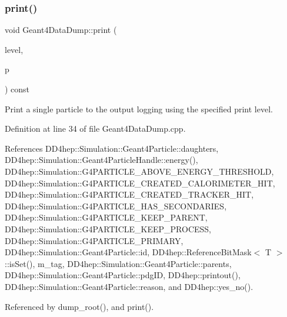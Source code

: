 \subsubsection{\texorpdfstring{print()}{print()}\hspace{0.1cm}{\footnotesize\ttfamily [1/6]}}
{\footnotesize\ttfamily void Geant4\+Data\+Dump\+::print (\begin{DoxyParamCaption}\item[{\hyperlink{namespace_d_d4hep_a5b5a64d56252469451f2020a27d57d42}{Print\+Level}}]{level,  }\item[{\hyperlink{class_d_d4hep_1_1_simulation_1_1_geant4_particle_handle}{Geant4\+Particle\+Handle}}]{p }\end{DoxyParamCaption}) const}



Print a single particle to the output logging using the specified print level. 



Definition at line 34 of file Geant4\+Data\+Dump.\+cpp.



References D\+D4hep\+::\+Simulation\+::\+Geant4\+Particle\+::daughters, D\+D4hep\+::\+Simulation\+::\+Geant4\+Particle\+Handle\+::energy(), D\+D4hep\+::\+Simulation\+::\+G4\+P\+A\+R\+T\+I\+C\+L\+E\+\_\+\+A\+B\+O\+V\+E\+\_\+\+E\+N\+E\+R\+G\+Y\+\_\+\+T\+H\+R\+E\+S\+H\+O\+LD, D\+D4hep\+::\+Simulation\+::\+G4\+P\+A\+R\+T\+I\+C\+L\+E\+\_\+\+C\+R\+E\+A\+T\+E\+D\+\_\+\+C\+A\+L\+O\+R\+I\+M\+E\+T\+E\+R\+\_\+\+H\+IT, D\+D4hep\+::\+Simulation\+::\+G4\+P\+A\+R\+T\+I\+C\+L\+E\+\_\+\+C\+R\+E\+A\+T\+E\+D\+\_\+\+T\+R\+A\+C\+K\+E\+R\+\_\+\+H\+IT, D\+D4hep\+::\+Simulation\+::\+G4\+P\+A\+R\+T\+I\+C\+L\+E\+\_\+\+H\+A\+S\+\_\+\+S\+E\+C\+O\+N\+D\+A\+R\+I\+ES, D\+D4hep\+::\+Simulation\+::\+G4\+P\+A\+R\+T\+I\+C\+L\+E\+\_\+\+K\+E\+E\+P\+\_\+\+P\+A\+R\+E\+NT, D\+D4hep\+::\+Simulation\+::\+G4\+P\+A\+R\+T\+I\+C\+L\+E\+\_\+\+K\+E\+E\+P\+\_\+\+P\+R\+O\+C\+E\+SS, D\+D4hep\+::\+Simulation\+::\+G4\+P\+A\+R\+T\+I\+C\+L\+E\+\_\+\+P\+R\+I\+M\+A\+RY, D\+D4hep\+::\+Simulation\+::\+Geant4\+Particle\+::id, D\+D4hep\+::\+Reference\+Bit\+Mask$<$ T $>$\+::is\+Set(), m\+\_\+tag, D\+D4hep\+::\+Simulation\+::\+Geant4\+Particle\+::parents, D\+D4hep\+::\+Simulation\+::\+Geant4\+Particle\+::pdg\+ID, D\+D4hep\+::printout(), D\+D4hep\+::\+Simulation\+::\+Geant4\+Particle\+::reason, and D\+D4hep\+::yes\+\_\+no().



Referenced by dump\+\_\+root(), and print().

